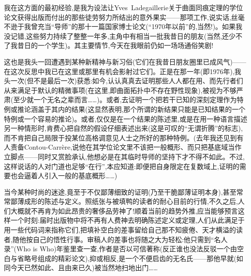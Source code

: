
我在这方面的最初经验,是我为设法让Yves~Ladegaillerie关于曲面同痕定理的学位论文获得出版而付出的那些徒劳努力所结出的意外果实——那项工作,说实话,丝毫不逊于我曾充当“导师”的那十一篇国家博士论文(“1970年以前”的,当然!)。如果我没记错,这些努力持续了整整一年多,主角中有相当一批我昔日的朋友(当然,还少不了我昔日的一个学生)。其主要情节,今天在我眼前仍如一场场通俗笑剧!

这也是我头一回遭遇到某种新精神与新习俗(它们在我昔日朋友圈里已成风气)——在这次反思中我已在这里或那里有机会影射过它们。正是在那一年(即1976年),我头一次(但不是最后一次)获悉:如今,认认真真去证明那些人人都在用、而先行者们从来满足于默认的精微事项(在这里,即曲面拓扑中不存在野性现象),被视为不够严肃(至少就一个无名之辈而言……)。或者,去证明一个把若干已知的深刻定理\dmark{}作为特例或推论涵盖于其内的结果(这显然表明,那个所谓的新结果只能是已知结果的一个特例或一个容易的推论)。或者,仅仅是在一个结果的陈述里,或是在用一种语言描述另一种情形时,肯费心把自然的假设仔细表述出来(这是可叹的“无谓折腾”的标志),而不肯把自己局限于投某位高格调意见人士之所好的那种特例。(去年我还见到有人责备Contou-Carrère,说他在其学位论文里不该把一般概形、而只把基底域当作立脚点——同时又赏脸承认,他想必是在其临时导师的坚持下才不得不如此。不过,这样说话的人对门道也足够“在行”,本应知道:即便把自身限定在复数域上,证明的需要也会逼着人引入一般的基底概形……)

当今某种时尚的迷途,竟至于不仅鄙薄细致的证明(乃至干脆鄙薄证明本身),甚至常常鄙薄成形的陈述与定义。照纸张与被填鸭的读者的耐心目前的行情,不久之后,人们大概就不再肯为如此昂贵的奢侈品劳神了!顺着当前的趋势外推,应当能够预言这样一个时刻:届时出版物中将不再有人费神去明确陈述定义或定理,人们从此满足于用一些代码词来指称它们,把填补空白的差事留给自己那不知疲倦、天才横溢的读者,随他按自己的悟性行事。审稿人的差事也将随之大为轻松:他只需到“名人录”(Who is Who)年鉴里查一查,作者是否以可信著称(反正谁也没法反驳一个由空白与省略号组成的精彩论文),抑或相反,是一个不便启齿的无名氏——那他早就(如同今天已然如此、且由来已久)被当然地扫地出门……
